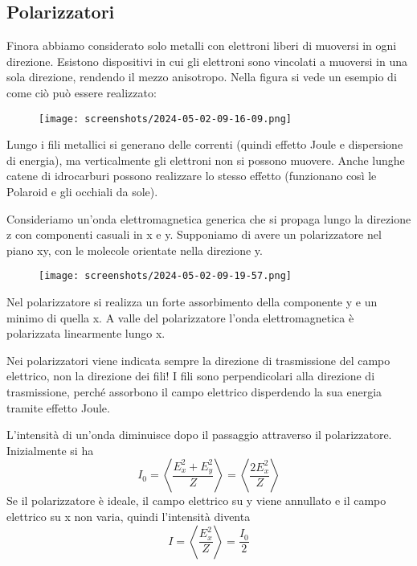 \subsection{Polarizzatori}

Finora abbiamo considerato solo metalli con elettroni liberi di muoversi in ogni direzione. Esistono dispositivi in cui gli elettroni sono vincolati a muoversi in una sola direzione, rendendo il mezzo anisotropo. Nella figura si vede un esempio di come ciò può essere realizzato:
\begin{figure}[H]
	\centering
	\texttt{[image: screenshots/2024-05-02-09-16-09.png]}
\end{figure}
Lungo i fili metallici si generano delle correnti (quindi effetto Joule e dispersione di energia), ma verticalmente gli elettroni non si possono muovere. Anche lunghe catene di idrocarburi possono realizzare lo stesso effetto (funzionano così le Polaroid e gli occhiali da sole).

Consideriamo un'onda elettromagnetica generica che si propaga lungo la direzione z con componenti casuali in x e y. Supponiamo di avere un polarizzatore nel piano xy, con le molecole orientate nella direzione y.
\begin{figure}[H]
	\centering
	\texttt{[image: screenshots/2024-05-02-09-19-57.png]}
\end{figure}
Nel polarizzatore si realizza un forte assorbimento della componente y e un minimo di quella x. A valle del polarizzatore l'onda elettromagnetica è polarizzata linearmente lungo x.
\begin{note}
	Nei polarizzatori viene indicata sempre la direzione di trasmissione del campo elettrico, non la direzione dei fili! I fili sono perpendicolari alla direzione di trasmissione, perché assorbono il campo elettrico disperdendo la sua energia tramite effetto Joule.
\end{note}

L'intensità di un'onda diminuisce dopo il passaggio attraverso il polarizzatore. Inizialmente si ha
\begin{equation}
	I_0 = \left\langle \frac{E_x ^{2} + E_y ^{2} }{Z} \right\rangle = \left\langle \frac{2E_x ^{2} }{Z} \right\rangle 
\end{equation}
Se il polarizzatore è ideale, il campo elettrico su y viene annullato e il campo elettrico su x non varia, quindi l'intensità diventa
\begin{equation}
	I = \left\langle \frac{E_x ^{2} }{Z} \right\rangle = \frac{I_0}{2}
\end{equation}

